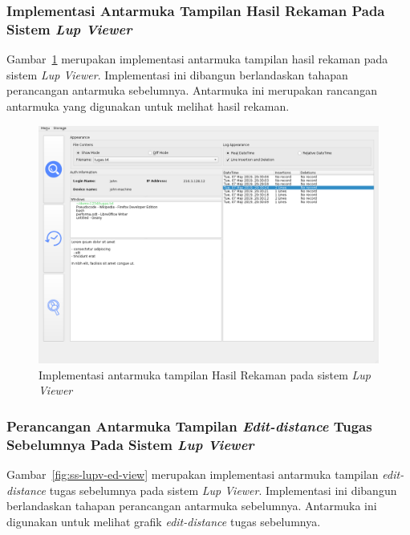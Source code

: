 \subsubsection{Implementasi Antarmuka Tampilan Hasil Rekaman Pada Sistem \emph{Lup Viewer}}

Gambar~\ref{fig:ss-lupv-log-view} merupakan implementasi antarmuka
tampilan hasil rekaman pada sistem \emph{Lup Viewer}. Implementasi ini
dibangun berlandaskan tahapan perancangan antarmuka
sebelumnya. Antarmuka ini merupakan rancangan antarmuka yang digunakan
untuk melihat hasil rekaman.

\begin{figure}[tph]
  \centering
  \includegraphics[width=.9\linewidth]{img/ui/ss-lupv-log-view}
  \caption{Implementasi antarmuka tampilan Hasil Rekaman pada sistem \emph{Lup
      Viewer}}\label{fig:ss-lupv-log-view}
\end{figure}

\subsubsection{Perancangan Antarmuka Tampilan \emph{Edit-distance} Tugas Sebelumnya Pada Sistem \emph{Lup Viewer}}

Gambar~\ref{fig:ss-lupv-ed-view} merupakan implementasi antarmuka
tampilan \emph{edit-distance} tugas sebelumnya pada sistem \emph{Lup
  Viewer}. Implementasi ini dibangun berlandaskan tahapan perancangan
antarmuka sebelumnya. Antarmuka ini digunakan untuk melihat grafik
\emph{edit-distance} tugas sebelumnya.


